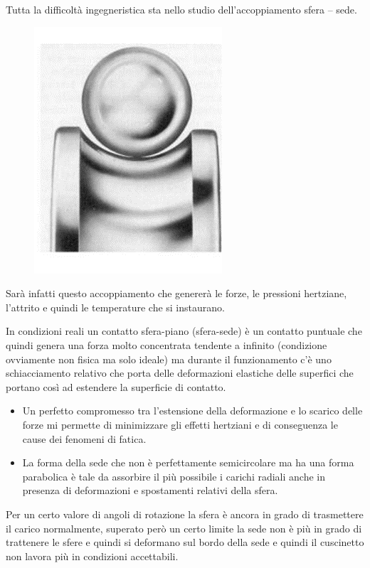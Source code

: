 \documentclass[a4paper, 15pt]{article}
\begin{document}
			Tutta la difficoltà ingegneristica sta nello studio dell’accoppiamento sfera – sede. 
			\begin{figure}[H]
				\centering
				\includegraphics[width=0.25\linewidth]{immagini/screenshot002}
				\label{fig:screenshot002}
			\end{figure}
			Sarà infatti questo accoppiamento che genererà le forze, le pressioni hertziane, l’attrito e quindi le temperature che si instaurano.  \newline 
			
			In condizioni reali un contatto sfera-piano (sfera-sede) è un contatto puntuale che quindi genera una forza molto concentrata tendente a infinito (condizione ovviamente non fisica ma solo ideale) ma durante il funzionamento c’è uno schiacciamento relativo che porta delle deformazioni elastiche delle superfici che portano così ad estendere la superficie di contatto.
			
			\begin{itemize}
				\item Un perfetto compromesso tra l’estensione della deformazione e lo scarico delle forze mi permette di minimizzare gli effetti hertziani e di conseguenza le cause dei fenomeni di fatica.
				
				\item La forma della sede che non è perfettamente semicircolare ma ha una forma parabolica è tale da assorbire il più possibile i carichi radiali anche in presenza di deformazioni e spostamenti relativi della sfera. 
			\end{itemize}
			
			Per un certo valore di angoli di rotazione la sfera è ancora in grado di trasmettere il carico normalmente, superato però un certo limite la sede non è più in grado di trattenere le sfere e quindi si deformano sul bordo della sede e quindi il cuscinetto non lavora più in condizioni accettabili.
			
\end{document}
